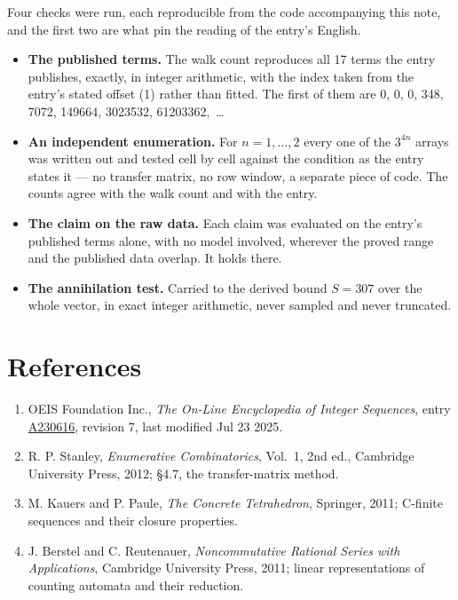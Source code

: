 \documentclass[11pt]{article}
\theoremstyle{definition}
\begin{document}
Four checks were run, each reproducible from the code accompanying this note, and the first two are what pin the reading of the entry's English.

\begin{itemize}

\item {\bfseries The published terms.} The walk count reproduces all 17 terms the entry publishes, exactly, in integer arithmetic, with the index taken from the entry's stated offset (1) rather than fitted. The first of them are 0, 0, 0, 348, 7072, 149664, 3023532, 61203362,~\dots

\item {\bfseries An independent enumeration.} For $n = 1,\dots,2$ every one of the $3^{4n}$ arrays was written out and tested cell by cell against the condition as the entry states it --- no transfer matrix, no row window, a separate piece of code. The counts agree with the walk count and with the entry.

\item {\bfseries The claim on the raw data.} Each claim was evaluated on the entry's published terms alone, with no model involved, wherever the proved range and the published data overlap. It holds there.

\item {\bfseries The annihilation test.} Carried to the derived bound $S = 307$ over the whole vector, in exact integer arithmetic, never sampled and never truncated.

\end{itemize}

\section{References}

\begin{enumerate}

\item OEIS Foundation Inc., \emph{The On-Line Encyclopedia of Integer Sequences}, entry \href{https://oeis.org/A230616}{A230616}, revision 7, last modified Jul 23 2025.

\item R. P. Stanley, \emph{Enumerative Combinatorics}, Vol.~1, 2nd ed., Cambridge University Press, 2012; \S4.7, the transfer-matrix method.

\item M. Kauers and P. Paule, \emph{The Concrete Tetrahedron}, Springer, 2011; C-finite sequences and their closure properties.

\item J. Berstel and C. Reutenauer, \emph{Noncommutative Rational Series with Applications}, Cambridge University Press, 2011; linear representations of counting automata and their reduction.

\end{enumerate}
\end{document}
